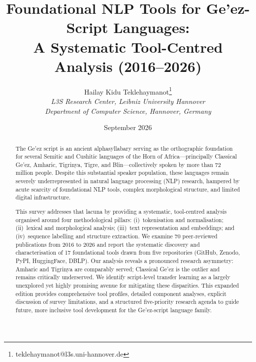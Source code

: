 \documentclass[12pt,a4paper]{article}
\theoremstyle{plain}
\theoremstyle{definition}
\begin{document}

\title{\textbf{Foundational NLP Tools for Ge'ez-Script Languages:}\\[8pt]
\textbf{A Systematic Tool-Centred Analysis (2016--2026)}}

\author{Hailay Kidu Teklehaymanot\footnote{teklehaymanot@l3s.uni-hannover.de}\\
\textit{L3S Research Center, Leibniz University Hannover}\\
\textit{Department of Computer Science, Hannover, Germany}}

\date{September 2026}

\maketitle


\begin{abstract}
The Ge'ez script is an ancient alphasyllabary serving as the orthographic foundation for several Semitic and Cushitic languages of the Horn of Africa---principally Classical Ge'ez, Amharic, Tigrinya, Tigre, and Blin---collectively spoken by more than 72 million people. Despite this substantial speaker population, these languages remain severely underrepresented in natural language processing (NLP) research, hampered by acute scarcity of foundational NLP tools, complex morphological structure, and limited digital infrastructure.

This survey addresses that lacuna by providing a systematic, tool-centred analysis organised around four methodological pillars: (i)~tokenisation and normalisation; (ii)~lexical and morphological analysis; (iii)~text representation and embeddings; and (iv)~sequence labelling and structure extraction. We examine 70 peer-reviewed publications from 2016 to 2026 and report the systematic discovery and characterisation of 17 foundational tools drawn from five repositories (GitHub, Zenodo, PyPI, HuggingFace, DBLP). Our analysis reveals a pronounced research asymmetry: Amharic and Tigrinya are comparably served; Classical Ge'ez is the outlier and remains critically underserved. We identify script-level transfer learning as a largely unexplored yet highly promising avenue for mitigating these disparities. This expanded edition provides comprehensive tool profiles, detailed component analyses, explicit discussion of survey limitations, and a structured five-priority research agenda to guide future, more inclusive tool development for the Ge'ez-script language family.
\end{abstract}
\end{document}
